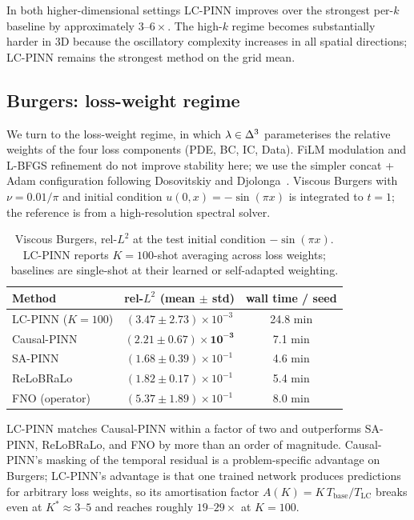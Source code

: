 \documentclass[12pt,a4paper]{extarticle}
\begin{document}
In both higher-dimensional settings LC-PINN improves over the strongest per-$k$ baseline by approximately $3$--$6\times$. The high-$k$ regime becomes substantially harder in 3D because the oscillatory complexity increases in all spatial directions; LC-PINN remains the strongest method on the grid mean.

\subsection{Burgers: loss-weight regime}

We turn to the loss-weight regime, in which $\lambda \in \Delta^3$ parameterises the relative weights of the four loss components (PDE, BC, IC, Data). FiLM modulation and L-BFGS refinement do not improve stability here; we use the simpler concat + Adam configuration following Dosovitskiy and Djolonga~\cite{dosovitskiy2020}. Viscous Burgers with $\nu = 0.01/\pi$ and initial condition $u(0, x) = -\sin(\pi x)$ is integrated to $t = 1$; the reference is from a high-resolution spectral solver.

\begin{table}[H]
\caption{Viscous Burgers, rel-$L^2$ at the test initial condition $-\sin(\pi x)$. LC-PINN reports $K = 100$-shot averaging across loss weights; baselines are single-shot at their learned or self-adapted weighting.}
\label{table:burgers}
\centering
\begin{tabular}{lcc}
\toprule
Method & rel-$L^2$ (mean $\pm$ std) & wall time / seed \\
\midrule
LC-PINN ($K = 100$)  & $(3.47 \pm 2.73) \times 10^{-3}$ & 24.8 min \\
Causal-PINN          & $\mathbf{(2.21 \pm 0.67) \times 10^{-3}}$ & 7.1 min \\
SA-PINN              & $(1.68 \pm 0.39) \times 10^{-1}$ & 4.6 min \\
ReLoBRaLo            & $(1.82 \pm 0.17) \times 10^{-1}$ & 5.4 min \\
FNO (operator)       & $(5.37 \pm 1.89) \times 10^{-1}$ & 8.0 min \\
\bottomrule
\end{tabular}
\end{table}

LC-PINN matches Causal-PINN within a factor of two and outperforms SA-PINN, ReLoBRaLo, and FNO by more than an order of magnitude. Causal-PINN's masking of the temporal residual is a problem-specific advantage on Burgers; LC-PINN's advantage is that one trained network produces predictions for arbitrary loss weights, so its amortisation factor $A(K) = K\, T_{\mathrm{base}} / T_{\mathrm{LC}}$ breaks even at $K^* \approx 3$--$5$ and reaches roughly $19$--$29\times$ at $K = 100$.
\end{document}
